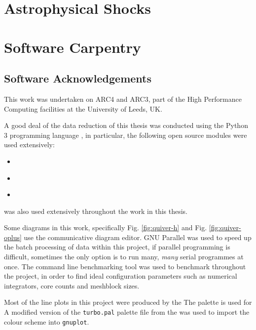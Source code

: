 \chapter{Astrophysical Shocks}

\chapter{Software Carpentry}

\section{Software Acknowledgements}

This work was undertaken on ARC4 and ARC3, part of the High Performance Computing facilities at the University of Leeds, UK.

A good deal of the data reduction of this thesis was conducted using the Python 3 programming language \parencite{10.5555/1593511}, in particular, the following open source modules were used extensively:

\begin{itemize}
  \item {} \parencite{harris2020array}
  \item {} \parencite{astropy:2013,astropy:2018}
  \item {} \parencite{Hunter:2007}
\end{itemize}

\athena{} \parencite{athena} was also used extensively throughout the work in this thesis.

Some diagrams in this work, specifically Fig. \ref{fig:quiver-h} and Fig. \ref{fig:quiver-oplus} use the  communicative diagram editor.
GNU Parallel \parencite{tange_2021_5523272} was used to speed up the batch processing of data within this project, if parallel programming is difficult, sometimes the only option is to run many, \textit{many} serial programmes at once.
The  command line benchmarking tool was used to benchmark \athena{} throughout the project, in order to find ideal configuration parameters such as numerical integrators, core counts and meshblock sizes.


Most of the line plots in this project were produced by the 
The  palette is used for
A modified version of the \texttt{turbo.pal} palette file from the  was used to import the colour scheme into \texttt{gnuplot}.

